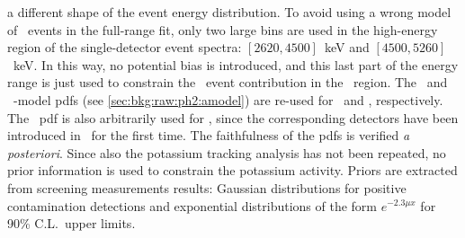 a different shape of the event energy distribution. To avoid using a wrong model of \a\
events in the full-range fit, only two large bins are used in the high-energy region of
the single-detector event spectra: $[2620, 4500]$~keV and $[4500, 5260]$~keV. In this way,
no potential bias is introduced, and this last part of the energy range is just used to
constrain the \a\ event contribution in the \nnbb\ region. The \enrBEGeII\ and \enrCoaxII\
\a-model pdfs (see \cref{sec:bkg:raw:ph2:amodel}) are re-used for \enrBEGeIIp\ and
\enrSCoaxIIp, respectively. The \enrBEGeII\ pdf is also arbitrarily used for \enrICoaxIIp,
since the corresponding detectors have been introduced in \phasetwop\ for the first time.
The faithfulness of the pdfs is verified \emph{a posteriori}.
\newpar
Since also the potassium tracking analysis has not been repeated, no prior information is
used to constrain the potassium activity. Priors are extracted from screening
measurements results: Gaussian distributions for positive contamination detections and
exponential distributions of the form $e^{-2.3 \mu x}$ for 90\% C.L.~upper limits.

